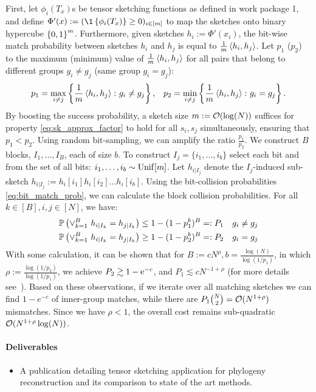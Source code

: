 First, let $\phi_i(T_x)$s be tensor sketching functions as defined in work package 1, and define $\Phi'(x):=(\1\Set{\phi_i(T_x)}\ge 0)_{i\in [m]}$ to map the sketches onto binary hypercube $\left\{0,1\right\}^m$. Furthermore, given sketches $h_i:=\Phi'(x_i)$, the bit-wise match probability between sketches $h_i$ and $h_j$ is equal to $\frac{1}{m}\left\langle h_i, h_j \right\rangle$. Let $p_1$ ($p_2$) to the maximum (minimum) value of $\frac{1}{m}\left\langle h_i, h_j \right\rangle$ for all pairs that belong to different groups $g_i\neq g_j$ (same group $g_i = g_j$):
\begin{align}
\label{eq:bit_match_prob}
p_1=\max_{i\neq j}\left\{\frac{1}{m}\left\langle h_i, h_j \right\rangle\colon g_i \neq g_j\right\},&&
p_2=\min_{i\neq j}\left\{\frac{1}{m}\left\langle h_i, h_j \right\rangle \colon g_i = g_j \right\}.
\end{align}
By boosting the success probability, a sketch size $m:=\mathcal{O}(\log(N))$ suffices for property \eqref{eq:sk_approx_factor} to hold for all $s_i,s_j$ simultaneously, ensuring that $p_1 < p_2$. 
Using random bit-sampling, we can amplify the ratio $\frac{p_1}{p_2}$. We construct $B$ blocks, $I_1,\dots,I_B$, each of size $b$. To construct $I_j=\{i_1,\dots, i_b\}$ select each bit \iid and \uar from the set of all bits: $i_1,\dots,i_b\sim\operatorname{\mathrm{Unif}}[m]$. Let $h_{i|I_j}$ denote the $I_j$-induced sub-sketch $h_{i|I_j}:=h_i[i_1] h_i[i_2] \dots h_i[i_b]$. Using the bit-collision probabilities \eqref{eq:bit_match_prob}, we can calculate the block collision probabilities. 
For all $k\in[B],i,j\in[N]$, we have:
\begin{align}
&\mathbb{P}\left( \vee_{k=1}^B\ h_{i|I_k}= h_{j|I_k} \right)\le 1-(1-p_1^b)^B=:P_1 && g_i \neq g_j \\
&\mathbb{P}\left( \vee_{k=1}^B\ h_{i|I_k}= h_{j|I_k} \right)\ge 1-(1-p_2^b)^B=:P_2 && g_i = g_j 
\end{align}
With some calculation, it can be shown that for $B:=c N^\rho, b=\frac{\log(N)}{\log(1/p_1)}$, in which $\rho:=\frac{\log(1/p_2)}{\log(1/p_1)}$, we achieve $P_2\gtrsim 1-\text{e}^{-c}$, and $P_1\lesssim c N^{-1+\rho}$ (for more details see~\cite{datar2004locality}). Based on these observations, if we iterate over all matching sketches we can find $1-e^{-c}$ of inner-group matches, while there are  $P_1\binom{N}{2} = \mathcal{O}(N^{1+\rho})$ mismatches. Since we have $\rho<1$, the overall cost remains sub-quadratic $\mathcal{O}(N^{1+\rho}\log(N))$. 





\paragraph{Deliverables}
\begin{itemize}
\item A publication detailing tensor sketching application for phylogeny reconstruction and its comparison to state of the art methods. 
\end{itemize}


